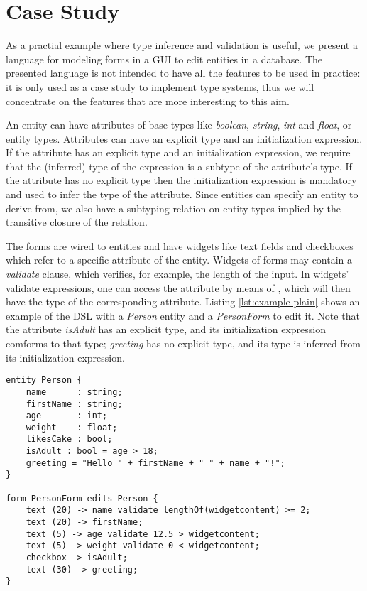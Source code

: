 \section{Case Study}
\label{sec:casestudy}

As a practial example where type inference and validation is useful, we present
a language for modeling forms in a GUI to edit entities in a database.  The
presented language is not intended to have all the features to be used in
practice: it is only used as a case study to implement type systems, thus we
will concentrate on the features that are more interesting to this aim.

An entity can have attributes of base types like \emph{boolean}, \emph{string},
\emph{int} and \emph{float}, or entity types.
Attributes can have an explicit type and an initialization expression.
If the attribute has an explicit type and an initialization expression, we
require that the (inferred) type of the expression is a subtype of the
attribute's type. If the attribute has no explicit type then the initialization
expression is mandatory and used to infer the type of the attribute.
Since entities can specify an entity to derive from, we also have a subtyping
relation on entity types implied by the transitive closure of the
 relation.

The forms are wired to entities and have widgets like text fields and
checkboxes which refer to a specific attribute of the entity.
Widgets of forms may contain a \emph{validate} clause, which verifies, for
example, the length of the input.
In widgets' validate expressions, one can access the attribute by means of
, which will then have the type of the corresponding
attribute.  Listing \ref{lst:example-plain} shows an example of the DSL with a \emph{Person}
entity and a \emph{PersonForm} to edit it. Note that the attribute
\emph{isAdult} has an explicit type, and its initialization expression
comforms to that type; \emph{greeting} has no explicit type, and its type is
inferred from its initialization expression.

%

\begin{lstlisting}[language=guidsl,float,label=lst:example-plain,caption=Forms
and Entities DSL.] 
entity Person {
	name      : string;
	firstName : string;
	age       : int; 
	weight    : float;
	likesCake : bool; 
	isAdult : bool = age > 18;
	greeting = "Hello " + firstName + " " + name + "!";
}

form PersonForm edits Person {
	text (20) -> name validate lengthOf(widgetcontent) >= 2;
	text (20) -> firstName;
	text (5) -> age validate 12.5 > widgetcontent;
	text (5) -> weight validate 0 < widgetcontent;
	checkbox -> isAdult;
	text (30) -> greeting;
}
\end{lstlisting}


